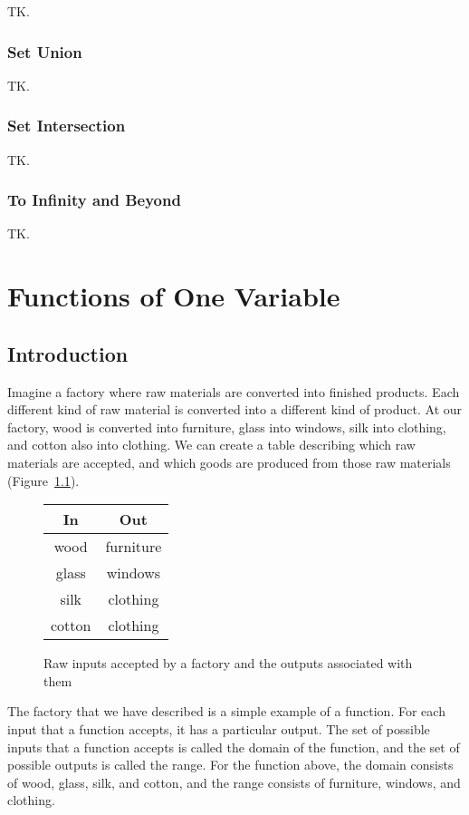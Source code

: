 \documentclass[a4paper,10pt]{report}
\begin{document}
TK.

\subsection{Set Union}

TK.

\subsection{Set Intersection}

TK.

\subsection{To Infinity and Beyond}

TK.

\chapter{Functions of One Variable}

\section{Introduction}

Imagine a factory where raw materials are converted into finished products.
Each different kind of raw material is converted into a different kind of
product. At our factory, wood is converted into furniture, glass into windows,
silk into clothing, and cotton also into clothing. We can create a table
describing which raw materials are accepted, and which goods are produced from
those raw materials (Figure~\ref{fov:factory}).

\begin{figure}
 \renewcommand{\arraystretch}{1.2}
 \begin{tabular}{|c|c|}
  \hline
  \textbf{In} & \textbf{Out} \\
  \hline
  wood & furniture \\
  glass & windows \\
  silk & clothing \\
  cotton & clothing \\
  \hline
 \end{tabular}

 \caption{Raw inputs accepted by a factory and the outputs associated with
 them}
 \label{fov:factory}
\end{figure}

The factory that we have described is a simple example of a \gls{function}. For
each input that a function accepts, it has a particular output. The set of
possible inputs that a function accepts is called the \gls{domain} of the
function, and the set of possible outputs is called the \gls{range}. For the
function above, the domain consists of wood, glass, silk, and cotton, and the
range consists of furniture, windows, and clothing.
\end{document}
